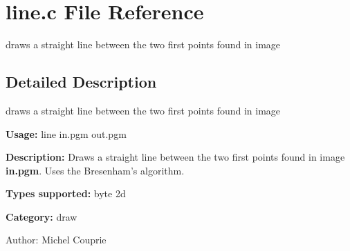 \section{line.c File Reference}
\label{line_8c}
draws a straight line between the two first points found in image  




\label{_details}
\subsection{Detailed Description}
draws a straight line between the two first points found in image 

{\bf Usage:} line in.pgm out.pgm

{\bf Description:} Draws a straight line between the two first points found in image {\bf in.pgm}. Uses the Bresenham's algorithm.

{\bf Types supported:} byte 2d

{\bf Category:} draw

\begin{Desc}
\item[Author:]Michel Couprie \end{Desc}
